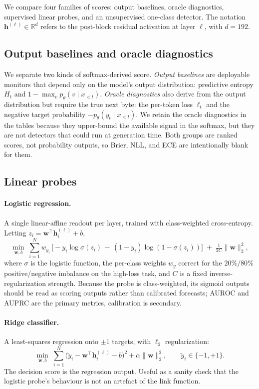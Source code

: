 \documentclass[11pt]{article}
\begin{document}
We compare four families of scores: output baselines, oracle diagnostics, supervised linear probes, and an unsupervised one-class detector. The notation $\mathbf{h}^{(\ell)} \in \mathbb{R}^{d}$ refers to the post-block residual activation at layer $\ell$, with $d=192$.

\subsection{Output baselines and oracle diagnostics}

We separate two kinds of softmax-derived score. \emph{Output baselines} are deployable monitors that depend only on the model's output distribution: predictive entropy $H_t$ and $1-\max_v p_\theta(v\mid x_{<t})$. \emph{Oracle diagnostics} also derive from the output distribution but require the true next byte: the per-token loss $\ell_t$ and the negative target probability $-p_\theta(y_t\mid x_{<t})$. We retain the oracle diagnostics in the tables because they upper-bound the available signal in the softmax, but they are not detectors that could run at generation time. Both groups are ranked scores, not probability outputs, so Brier, NLL, and ECE are intentionally blank for them.

\subsection{Linear probes}

\paragraph{Logistic regression.} A single linear-affine readout per layer, trained with class-weighted cross-entropy. Letting $z_i = \mathbf{w}^\top \mathbf{h}_i^{(\ell)} + b$,
\begin{equation}
  \min_{\mathbf{w},b}\; \sum_{i=1}^{N} w_{y_i}\,\big[\!-y_i \log \sigma(z_i)\,-\,(1-y_i)\log(1-\sigma(z_i))\big] \;+\; \tfrac{1}{2C}\|\mathbf{w}\|_2^{2},
\end{equation}
where $\sigma$ is the logistic function, the per-class weights $w_y$ correct for the $20\%/80\%$ positive/negative imbalance on the high-loss task, and $C$ is a fixed inverse-regularization strength. Because the probe is class-weighted, its sigmoid outputs should be read as scoring outputs rather than calibrated forecasts; AUROC and AUPRC are the primary metrics, calibration is secondary.

\paragraph{Ridge classifier.} A least-squares regression onto $\pm 1$ targets, with $\ell_2$ regularization:
\begin{equation}
  \min_{\mathbf{w},b}\; \sum_{i=1}^{N} \big(\tilde{y}_i - \mathbf{w}^\top \mathbf{h}_i^{(\ell)} - b\big)^{2} + \alpha \|\mathbf{w}\|_{2}^{2},\qquad \tilde{y}_i \in \{-1,+1\}.
\end{equation}
The decision score is the regression output. Useful as a sanity check that the logistic probe's behaviour is not an artefact of the link function.
\end{document}
